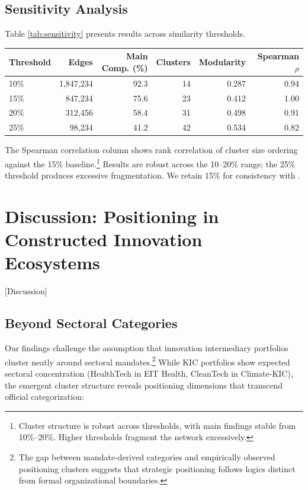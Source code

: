 \documentclass[../main.tex]{subfiles}
\begin{document}
\subsection{Sensitivity Analysis}

Table \ref{tab:sensitivity} presents results across similarity thresholds.

\begin{center}
\small
\begin{tabular}{lrrrrr}
\toprule
\textbf{Threshold} & \textbf{Edges} & \textbf{Main Comp. (\%)} & \textbf{Clusters} & \textbf{Modularity} & \textbf{Spearman $\rho$} \\
\midrule
10\% & 1,847,234 & 92.3 & 14 & 0.287 & 0.94 \\
15\% & 847,234 & 75.6 & 23 & 0.412 & 1.00 \\
20\% & 312,456 & 58.4 & 31 & 0.498 & 0.91 \\
25\% & 98,234 & 41.2 & 42 & 0.534 & 0.82 \\
\bottomrule
\end{tabular}
\end{center}

The Spearman correlation column shows rank correlation of cluster size ordering against the 15\% baseline.\footnote{Cluster structure is robust across thresholds, with main findings stable from 10\%--20\%. Higher thresholds fragment the network excessively.} Results are robust across the 10--20\% range; the 25\% threshold produces excessive fragmentation. We retain 15\% for consistency with \cite{basole2019visual}.

\section{Discussion: Positioning in Constructed Innovation Ecosystems}[Discussion]

\subsection{Beyond Sectoral Categories}

Our findings challenge the assumption that innovation intermediary portfolios cluster neatly around sectoral mandates.\footnote{The gap between mandate-derived categories and empirically observed positioning clusters suggests that strategic positioning follows logics distinct from formal organizational boundaries.} While KIC portfolios show expected sectoral concentration (HealthTech in EIT Health, CleanTech in Climate-KIC), the emergent cluster structure reveals positioning dimensions that transcend official categorization:
\end{document}
